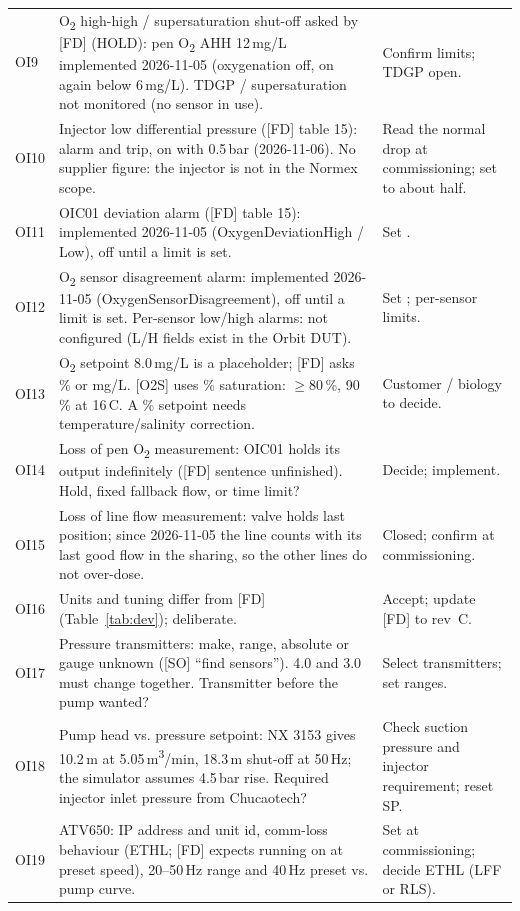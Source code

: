 \documentclass[11pt,a4paper]{article}
\newcommand{\Otwo}{O\textsubscript{2}}
\newcommand{\degC}{\,\textdegree C}
\begin{document}
\begin{small}
\begin{longtable}{@{}P{9mm}P{98mm}P{48mm}@{}}
OI9 & \Otwo{} high-high / supersaturation shut-off asked by [FD] (HOLD): pen \Otwo{} AHH 12\,mg/L implemented 2026-11-05 (oxygenation off, on again below 6\,mg/L). TDGP / supersaturation not monitored (no sensor in use). & Confirm limits; TDGP open. \\
OI10 & Injector low differential pressure ([FD] table 15): alarm and trip, on with 0.5\,bar (2026-11-06). No supplier figure: the injector is not in the Normex scope. & Read the normal drop at commissioning; set  to about half. \\
OI11 & OIC01 deviation alarm ([FD] table 15): implemented 2026-11-05 (OxygenDeviationHigh / Low), off until a limit is set. & Set . \\
OI12 & \Otwo{} sensor disagreement alarm: implemented 2026-11-05 (OxygenSensorDisagreement), off until a limit is set. Per-sensor low/high alarms: not configured (L/H fields exist in the Orbit DUT). & Set ; per-sensor limits. \\
OI13 & \Otwo{} setpoint 8.0\,mg/L is a placeholder; [FD] asks \% or mg/L. [O2S] uses \% saturation: $\geq$80\,\%, 90\,\% at 16\degC. A \% setpoint needs temperature/salinity correction. & Customer / biology to decide. \\
OI14 & Loss of pen \Otwo{} measurement: OIC01 holds its output indefinitely ([FD] sentence unfinished). Hold, fixed fallback flow, or time limit? & Decide; implement. \\
OI15 & Loss of line flow measurement: valve holds last position; since 2026-11-05 the line counts with its last good flow in the sharing, so the other lines do not over-dose. & Closed; confirm at commissioning. \\
OI16 & Units and tuning differ from [FD] (Table~\ref{tab:dev}); deliberate. & Accept; update [FD] to rev~C. \\
OI17 & Pressure transmitters: make, range, absolute or gauge unknown ([SO] ``find sensors'').  4.0 and  3.0 must change together. Transmitter before the pump wanted? & Select transmitters; set ranges. \\
OI18 & Pump head vs. pressure setpoint: NX 3153 gives 10.2\,m at 5.05\,m\textsuperscript{3}/min, 18.3\,m shut-off at 50\,Hz; the simulator assumes 4.5\,bar rise. Required injector inlet pressure from Chucaotech? & Check suction pressure and injector requirement; reset SP. \\
OI19 & ATV650: IP address and unit id, comm-loss behaviour (ETHL; [FD] expects running on at preset speed), 20--50\,Hz range and 40\,Hz preset vs. pump curve. & Set at commissioning; decide ETHL (LFF or RLS). \\

\end{longtable}
\end{small}
\end{document}
